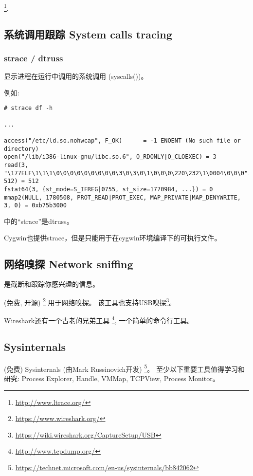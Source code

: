 \documentclass[UTF8,nofonts]{ctexart}
\begin{document}
\footnote{\url{http://www.ltrace.org/}}.

\subsection{系统调用跟踪 System calls tracing}

\label{strace}
\subsubsection{strace / dtruss}

显示进程在运行中调用的系统调用 (syscalls())。

例如:

\begin{lstlisting}
# strace df -h

...

access("/etc/ld.so.nohwcap", F_OK)      = -1 ENOENT (No such file or directory)
open("/lib/i386-linux-gnu/libc.so.6", O_RDONLY|O_CLOEXEC) = 3
read(3, "\177ELF\1\1\1\0\0\0\0\0\0\0\0\0\3\0\3\0\1\0\0\0\220\232\1\0004\0\0\0"..., 512) = 512
fstat64(3, {st_mode=S_IFREG|0755, st_size=1770984, ...}) = 0
mmap2(NULL, 1780508, PROT_READ|PROT_EXEC, MAP_PRIVATE|MAP_DENYWRITE, 3, 0) = 0xb75b3000
\end{lstlisting}

\myindex{\MacOSX}
\MacOSX 中的``strace''是dtruss。

Cygwin也提供strace，但是只能用于在cygwin环境编译下的可执行文件。

\subsection{网络嗅探 Network sniffing}

 是截断和跟踪你感兴趣的信息。

(免费, 开源) \footnote{\url{https://www.wireshark.org/}} 用于网络嗅探。
该工具也支持USB嗅探\footnote{\url{https://wiki.wireshark.org/CaptureSetup/USB}}。

Wireshark还有一个古老的兄弟工具 \footnote{\url{http://www.tcpdump.org/}}, 一个简单的命令行工具。

\subsection{Sysinternals}

(免费) Sysinternals (由Mark Russinovich开发)
\footnote{\url{https://technet.microsoft.com/en-us/sysinternals/bb842062}}。
至少以下重要工具值得学习和研究: Process Explorer, Handle, VMMap, TCPView, Process Monitor。
\end{document}
